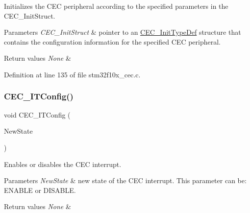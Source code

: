 Initializes the C\+EC peripheral according to the specified parameters in the C\+E\+C\+\_\+\+Init\+Struct. 


\begin{DoxyParams}{Parameters}
{\em C\+E\+C\+\_\+\+Init\+Struct} & pointer to an \hyperlink{struct_c_e_c___init_type_def}{C\+E\+C\+\_\+\+Init\+Type\+Def} structure that contains the configuration information for the specified C\+EC peripheral. \\
\hline
\end{DoxyParams}

\begin{DoxyRetVals}{Return values}
{\em None} & \\
\hline
\end{DoxyRetVals}


Definition at line 135 of file stm32f10x\+\_\+cec.\+c.

\mbox{\label{group___c_e_c___private___functions_ga8be87c514505cf82eb29334f054fc0bc}} 
\subsubsection{\texorpdfstring{C\+E\+C\+\_\+\+I\+T\+Config()}{CEC\_ITConfig()}}
{\footnotesize\ttfamily void C\+E\+C\+\_\+\+I\+T\+Config (\begin{DoxyParamCaption}\item[{\hyperlink{group___exported__types_gac9a7e9a35d2513ec15c3b537aaa4fba1}{Functional\+State}}]{New\+State }\end{DoxyParamCaption})}



Enables or disables the C\+EC interrupt. 


\begin{DoxyParams}{Parameters}
{\em New\+State} & new state of the C\+EC interrupt. This parameter can be\+: E\+N\+A\+B\+LE or D\+I\+S\+A\+B\+LE. \\
\hline
\end{DoxyParams}

\begin{DoxyRetVals}{Return values}
{\em None} & \\
\hline
\end{DoxyRetVals}


